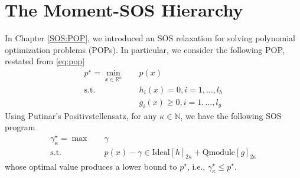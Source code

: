 \documentclass[
]{book}
\theoremstyle{definition}
\theoremstyle{definition}
\theoremstyle{definition}
\theoremstyle{definition}
\theoremstyle{remark}
\begin{document}
\section{The Moment-SOS Hierarchy}\label{the-moment-sos-hierarchy}

In Chapter \ref{SOS:POP}, we introduced an SOS relaxation for solving polynomial optimization problems (POPs). In particular, we consider the following POP, restated from \eqref{eq:pop}
\begin{equation}
\begin{split}
p^\star = \min_{x \in \mathbb{R}^{n}} & \quad p(x) \\
\mathrm{s.t.}& \quad h_i(x) = 0, i=1,\dots,l_h \\
& \quad g_i(x) \geq 0, i=1,\dots,l_g
\end{split}
\label{eq:pop-restate}
\end{equation}
Using Putinar's Positivstellensatz, for any \(\kappa \in \mathbb{N}\), we have the following SOS program
\begin{equation}
\boxed{
\begin{split}
\gamma_{\kappa}^\star = \max & \quad \gamma \\
 \mathrm{s.t.}& \quad p(x) - \gamma \in \mathrm{Ideal}[h]_{2\kappa} + \mathrm{Qmodule}[g]_{2\kappa}
\end{split}
}
\label{eq:SOS-Putinar-restate}
\end{equation}
whose optimal value produces a lower bound to \(p^\star\), i.e., \(\gamma_{\kappa}^\star \leq p^\star\).
\end{document}
